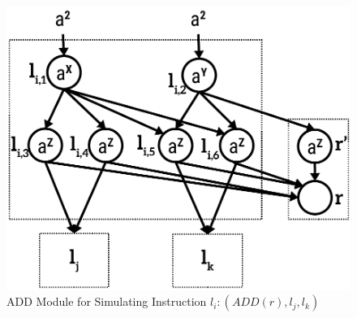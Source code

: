 \documentclass[smallextended]{svjour3}
\begin{document}
\begin{figure}
\begin{center}
\includegraphics[scale=0.50]{Fig1.pdf}
\caption{ADD Module for Simulating Instruction $l_i:(ADD(r), l_j, l_k)$}
\label{fig-add}
\end{center}
\end{figure}   
\end{document}
